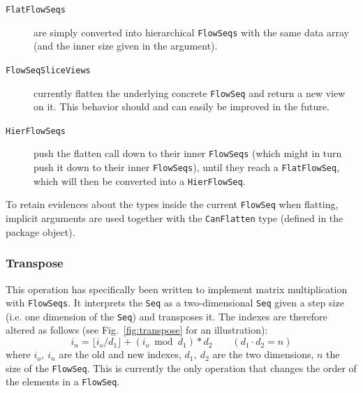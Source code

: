 \documentclass[runningheads,a4paper,fleqn]{llncs}
\begin{document}
\begin{description}
\item[\texttt{FlatFlowSeqs}] are simply converted into hierarchical
  \texttt{FlowSeqs} with the same data array (and the inner size given in the
  argument).
\item[\texttt{FlowSeqSliceViews}] currently flatten the underlying
  concrete \texttt{FlowSeq} and return a new view on it. This behavior
  should and can easily be improved in the future.
\item[\texttt{HierFlowSeqs}] push the flatten call down to their
  inner \texttt{FlowSeqs} (which might in turn push it down to their
  inner \texttt{FlowSeqs}), until they reach a \texttt{FlatFlowSeq},
  which will then be converted into a \texttt{HierFlowSeq}.
\end{description}

To retain evidences about the types inside the current \texttt{FlowSeq} when
flatting, implicit arguments are used together with the
\texttt{CanFlatten} type (defined in the package object).

\subsubsection{Transpose}
This operation has specifically been written to implement matrix
multiplication with \texttt{FlowSeqs}. It interprets the \texttt{Seq}
as a two-dimensional \texttt{Seq} given a step size (i.e. one
dimension of the \texttt{Seq}) and transposes it. The indexes are
therefore altered as follows (see Fig.~\ref{fig:transpose} for an
illustration): 
\[ i_n = \lfloor i_o / d_1 \rfloor + (i_o \bmod d_1) * d_2 \qquad (d_1
\cdot d_2 = n)\]
where $i_o,\ i_n$ are the old and new indexes, $d_1,\ d_2$ are the two
dimensions, $n$ the size of the \texttt{FlowSeq}. This is currently the only
operation that changes the order of the elements in a \texttt{FlowSeq}.
\end{document}
